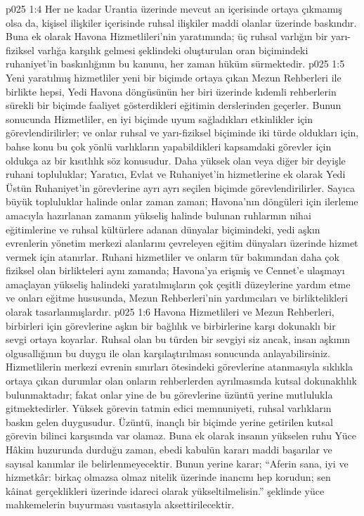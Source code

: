 \vs p025 1:4 Her ne kadar Urantia üzerinde mevcut an içerisinde ortaya çıkmamış olsa da, kişisel ilişkiler içerisinde ruhsal ilişkiler maddi olanlar üzerinde baskındır. Buna ek olarak Havona Hizmetlileri’nin yaratımında; üç ruhsal varlığın bir yarı\hyp{}fiziksel varlığa karşılık gelmesi şeklindeki oluşturulan oran biçimindeki ruhaniyet’in baskınlığının bu kanunu, her zaman hüküm sürmektedir.
\vs p025 1:5 Yeni yaratılmış hizmetliler yeni bir biçimde ortaya çıkan Mezun Rehberleri ile birlikte hepsi, Yedi Havona döngüsünün her biri üzerinde kıdemli rehberlerin sürekli bir biçimde faaliyet gösterdikleri eğitimin derslerinden geçerler. Bunun sonucunda Hizmetliler, en iyi biçimde uyum sağladıkları etkinlikler için görevlendirilirler; ve onlar ruhsal ve yarı\hyp{}fiziksel biçiminde iki türde oldukları için, bahse konu bu çok yönlü varlıkların yapabildikleri kapsamdaki görevler için oldukça az bir kısıtlılık söz konusudur. Daha yüksek olan veya diğer bir deyişle ruhani topluluklar; Yaratıcı, Evlat ve Ruhaniyet’in hizmetlerine ek olarak Yedi Üstün Ruhaniyet’in görevlerine ayrı ayrı seçilen biçimde görevlendirilirler. Sayıca büyük topluluklar halinde onlar zaman zaman; Havona’nın döngüleri için ilerleme amacıyla hazırlanan zamanın yükseliş halinde bulunan ruhlarının nihai eğitimlerine ve ruhsal kültürlere adanan dünyalar biçimindeki, yedi aşkın evrenlerin yönetim merkezi alanlarını çevreleyen eğitim dünyaları üzerinde hizmet vermek için atanırlar. Ruhani hizmetliler ve onların tür bakımından daha çok fiziksel olan birlikteleri aynı zamanda; Havona’ya erişmiş ve Cennet’e ulaşmayı amaçlayan yükseliş halindeki yaratılmışların çok çeşitli düzeylerine yardım etme ve onları eğitme hususunda, Mezun Rehberleri’nin yardımcıları ve birliktelikleri olarak tasarlanmışlardır.
\vs p025 1:6 Havona Hizmetlileri ve Mezun Rehberleri, birbirleri için görevlerine aşkın bir bağlılık ve birbirlerine karşı dokunaklı bir sevgi ortaya koyarlar. Ruhsal olan bu türden bir sevgiyi siz ancak, insan aşkının olgusallığının bu duygu ile olan karşılaştırılması sonucunda anlayabilirsiniz. Hizmetlilerin merkezi evrenin sınırları ötesindeki görevlerine atanmasıyla sıklıkla ortaya çıkan durumlar olan onların rehberlerden ayrılmasında kutsal dokunaklılık bulunmaktadır; fakat onlar yine de bu görevlerine üzüntü yerine mutlulukla gitmektedirler. Yüksek görevin tatmin edici memnuniyeti, ruhsal varlıkların baskın gelen duygusudur. Üzüntü, inançlı bir biçimde yerine getirilen kutsal görevin bilinci karşısında var olamaz. Buna ek olarak insanın yükselen ruhu Yüce Hâkim huzurunda durduğu zaman, ebedi kabulün kararı maddi başarılar ve sayısal kanımlar ile belirlenmeyecektir. Bunun yerine karar; “Aferin sana, iyi ve  hizmetkâr: birkaç olmazsa olmaz nitelik üzerinde inancını hep korudun; sen kâinat gerçeklikleri üzerinde idareci olarak yükseltilmelisin.” şeklinde yüce mahkemelerin buyurması vasıtasıyla aksettirilecektir.
